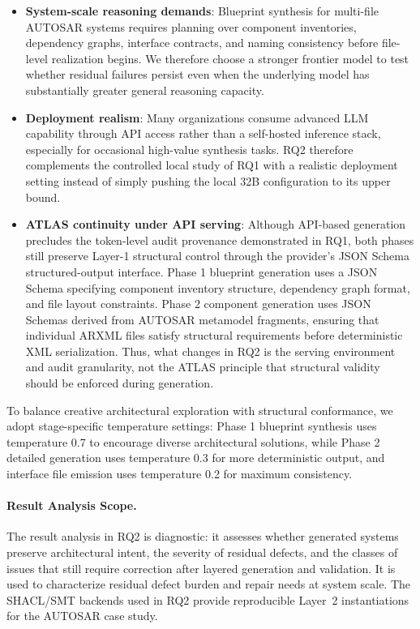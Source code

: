 \documentclass[acmlarge,nonacm]{acmart}
\theoremstyle{acmplain}
\theoremstyle{acmdefinition}
\begin{document}
\begin{itemize}[leftmargin=*,itemsep=0.5ex]
\item \textbf{System-scale reasoning demands}: Blueprint synthesis for multi-file AUTOSAR systems requires planning over component inventories, dependency graphs, interface contracts, and naming consistency before file-level realization begins. We therefore choose a stronger frontier model to test whether residual failures persist even when the underlying model has substantially greater general reasoning capacity.

\item \textbf{Deployment realism}: Many organizations consume advanced LLM capability through API access rather than a self-hosted inference stack, especially for occasional high-value synthesis tasks. RQ2 therefore complements the controlled local study of RQ1 with a realistic deployment setting instead of simply pushing the local 32B configuration to its upper bound.

\item \textbf{ATLAS continuity under API serving}: Although API-based generation precludes the token-level audit provenance demonstrated in RQ1, both phases still preserve Layer-1 structural control through the provider's JSON Schema structured-output interface. Phase 1 blueprint generation uses a JSON Schema specifying component inventory structure, dependency graph format, and file layout constraints. Phase 2 component generation uses JSON Schemas derived from AUTOSAR metamodel fragments, ensuring that individual ARXML files satisfy structural requirements before deterministic XML serialization. Thus, what changes in RQ2 is the serving environment and audit granularity, not the ATLAS principle that structural validity should be enforced during generation.
\end{itemize}

To balance creative architectural exploration with structural conformance, we adopt stage-specific temperature settings: Phase 1 blueprint synthesis uses temperature 0.7 to encourage diverse architectural solutions, while Phase 2 detailed generation uses temperature 0.3 for more deterministic output, and interface file emission uses temperature 0.2 for maximum consistency. 

\paragraph{Result Analysis Scope.}
The result analysis in RQ2 is diagnostic: it assesses whether generated systems preserve architectural intent, the severity of residual defects, and the classes of issues that still require correction after layered generation and validation. It is used to characterize residual defect burden and repair needs at system scale. The SHACL/SMT backends used in RQ2 provide reproducible Layer~2 instantiations for the AUTOSAR case study.
\end{document}
